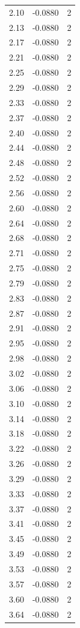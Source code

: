 \begin{longtable}{lrr}
  2.10 & -0.0880 & 2 \\
  2.13 & -0.0880 & 2 \\
  2.17 & -0.0880 & 2 \\
  2.21 & -0.0880 & 2 \\
  2.25 & -0.0880 & 2 \\
  2.29 & -0.0880 & 2 \\
  2.33 & -0.0880 & 2 \\
  2.37 & -0.0880 & 2 \\
  2.40 & -0.0880 & 2 \\
  2.44 & -0.0880 & 2 \\
  2.48 & -0.0880 & 2 \\
  2.52 & -0.0880 & 2 \\
  2.56 & -0.0880 & 2 \\
  2.60 & -0.0880 & 2 \\
  2.64 & -0.0880 & 2 \\
  2.68 & -0.0880 & 2 \\
  2.71 & -0.0880 & 2 \\
  2.75 & -0.0880 & 2 \\
  2.79 & -0.0880 & 2 \\
  2.83 & -0.0880 & 2 \\
  2.87 & -0.0880 & 2 \\
  2.91 & -0.0880 & 2 \\
  2.95 & -0.0880 & 2 \\
  2.98 & -0.0880 & 2 \\
  3.02 & -0.0880 & 2 \\
  3.06 & -0.0880 & 2 \\
  3.10 & -0.0880 & 2 \\
  3.14 & -0.0880 & 2 \\
  3.18 & -0.0880 & 2 \\
  3.22 & -0.0880 & 2 \\
  3.26 & -0.0880 & 2 \\
  3.29 & -0.0880 & 2 \\
  3.33 & -0.0880 & 2 \\
  3.37 & -0.0880 & 2 \\
  3.41 & -0.0880 & 2 \\
  3.45 & -0.0880 & 2 \\
  3.49 & -0.0880 & 2 \\
  3.53 & -0.0880 & 2 \\
  3.57 & -0.0880 & 2 \\
  3.60 & -0.0880 & 2 \\
  3.64 & -0.0880 & 2 \\

\end{longtable}
